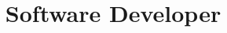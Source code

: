 \documentclass[10pt,a4paper,sans]{moderncv}
\title{Software Developer}
\begin{document}
    \makecvtitle

    
    
    
    
    

    \clearpage
\end{document}

